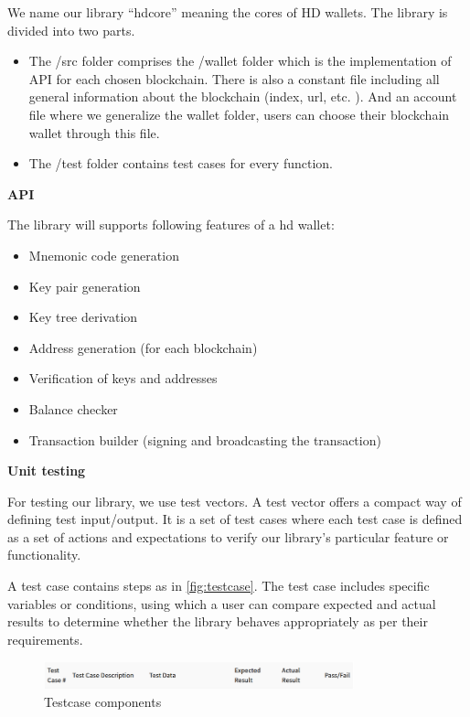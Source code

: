 We name our library “hdcore” meaning the cores of HD wallets. The library is divided into two parts.

\begin{itemize}
    \item The /src folder comprises the /wallet folder which is the implementation of API for each chosen blockchain. There is also a constant file including all general information about the blockchain (index, url, etc. ). And an account file where we generalize the wallet folder, users can choose their blockchain wallet through this file.
    \item The /test folder contains test cases for every function.
\end{itemize}

\bigskip
{\textbf{API}}

The library will supports following features of a hd wallet:

\begin{itemize}
    \item Mnemonic code generation
    \item  Key pair generation
    \item Key tree derivation
    \item Address generation (for each blockchain)
    \item Verification of keys and addresses
    \item Balance checker
    \item Transaction builder (signing and broadcasting the transaction)
\end{itemize}


\bigskip
{\textbf{Unit testing}}

For testing our library, we use test vectors. A test vector offers a compact way of defining test input/output. It is a set of test cases where each test case is defined as a set of actions and expectations to verify our library's particular feature or functionality.

A test case contains steps as in \autoref{fig:testcase}. The test case includes specific variables or conditions, using which a user can compare expected and actual results to determine whether the library behaves appropriately as per their requirements.

\begin{figure}[ht!]
    \centering
    \includegraphics[width=0.8\textwidth]{images/testcase.png}
    \caption[Testcase components]{Testcase components}
    \label{fig:testcase}
\end{figure}

